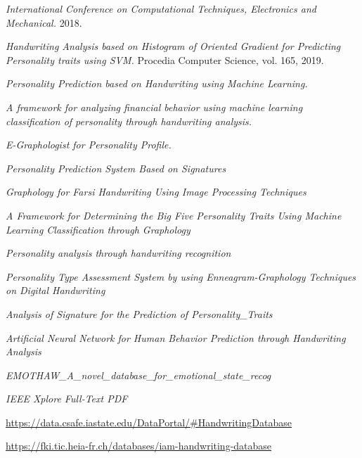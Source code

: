 \documentclass[10pt, a4paper]{article}
\begin{document}
		\normalsize
		
\begin{thebibliography}{99}
         \emph{International Conference on Computational Techniques, Electronics and Mechanical.} 2018. 
    
         \emph{Handwriting Analysis based on Histogram of Oriented Gradient for Predicting Personality traits using SVM.} Procedia Computer Science, vol. 165, 2019.
    
         \emph{Personality Prediction based on Handwriting using Machine Learning.}
        
         \emph{A framework for analyzing financial behavior using machine learning classification of personality through handwriting analysis.}
    
         \emph{E-Graphologist for Personality Profile.}

          \emph{Personality Prediction System Based on Signatures}
        
          \emph{Graphology for Farsi Handwriting Using Image Processing Techniques    }
        
          \emph{A Framework for Determining the Big Five Personality Traits Using Machine Learning Classification through Graphology}
        
          \emph{Personality analysis through handwriting recognition}
        
         \emph{Personality Type Assessment System by using  Enneagram-Graphology Techniques on Digital  Handwriting}
        
         \emph{Analysis of Signature for the Prediction of Personality\_Traits}
        
         \emph{Artificial Neural Network for Human Behavior Prediction  through Handwriting Analysis}
        
         \emph{EMOTHAW\_A\_novel\_database\_for\_emotional\_state\_recog}
        
         \emph{IEEE Xplore Full-Text PDF}
        
         \url{https://data.csafe.iastate.edu/DataPortal/#HandwritingDatabase} 
        
         \url{https://fki.tic.heia-fr.ch/databases/iam-handwriting-database} 


\end{thebibliography}
\end{document}
